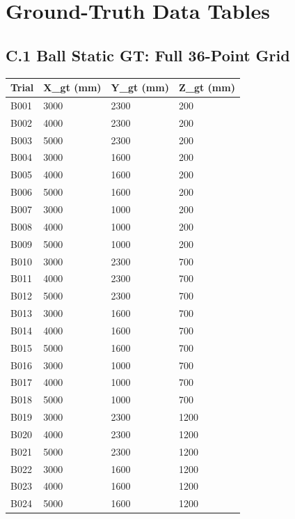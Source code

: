 \cleardoublepage
{}
\chapter{Ground-Truth Data Tables}

\section*{C.1 Ball Static GT: Full 36-Point Grid}

\begin{table}[htbp]
\centering
\begin{tabular}{|l|l|l|l|}
\hline
\textbf{Trial} & \textbf{X\_gt (mm)} & \textbf{Y\_gt (mm)} & \textbf{Z\_gt (mm)} \\
\hline
B001 & 3000 & 2300 & 200 \\
\hline
B002 & 4000 & 2300 & 200 \\
\hline
B003 & 5000 & 2300 & 200 \\
\hline
B004 & 3000 & 1600 & 200 \\
\hline
B005 & 4000 & 1600 & 200 \\
\hline
B006 & 5000 & 1600 & 200 \\
\hline
B007 & 3000 & 1000 & 200 \\
\hline
B008 & 4000 & 1000 & 200 \\
\hline
B009 & 5000 & 1000 & 200 \\
\hline
B010 & 3000 & 2300 & 700 \\
\hline
B011 & 4000 & 2300 & 700 \\
\hline
B012 & 5000 & 2300 & 700 \\
\hline
B013 & 3000 & 1600 & 700 \\
\hline
B014 & 4000 & 1600 & 700 \\
\hline
B015 & 5000 & 1600 & 700 \\
\hline
B016 & 3000 & 1000 & 700 \\
\hline
B017 & 4000 & 1000 & 700 \\
\hline
B018 & 5000 & 1000 & 700 \\
\hline
B019 & 3000 & 2300 & 1200 \\
\hline
B020 & 4000 & 2300 & 1200 \\
\hline
B021 & 5000 & 2300 & 1200 \\
\hline
B022 & 3000 & 1600 & 1200 \\
\hline
B023 & 4000 & 1600 & 1200 \\
\hline
B024 & 5000 & 1600 & 1200 \\

\end{tabular}
\end{table}
